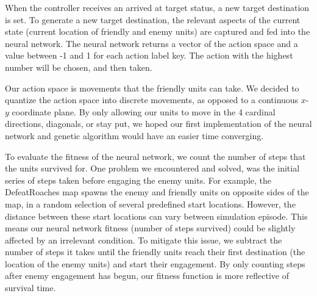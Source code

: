\documentclass{article}
\begin{document}

When the controller receives an arrived at target status, a new
target destination is set.  To generate a new target destination, the relevant
aspects of the current state (current location of friendly and enemy units) are
captured and fed into the neural network.  The neural network returns a
vector of the action space and a value between -1 and 1 for each
action label key. The action with the highest number will be chosen, and then
taken.

Our action space is movements that the friendly units can take. We decided to
quantize the action space into discrete movements, as opposed to a continuous
$x$-$y$ coordinate plane. By only allowing our units to move in the 4 cardinal
directions, diagonals, or stay put, we hoped our first implementation of the
neural network and genetic algorithm would have an easier time converging. 

To evaluate the fitness of the neural network, we count the number of steps that
the units survived for.  One problem we encountered and solved, was the initial
series of steps taken before engaging the enemy units. For example, the
DefeatRoaches map spawns the enemy and friendly units on opposite sides of the
map, in a random selection of several predefined start locations.  However, the
distance between these start locations can vary between simulation episode.
This means our neural network fitness (number of steps survived) could be
slightly affected by an irrelevant condition.  To mitigate this issue, we
subtract the number of steps it takes until the friendly units reach their first
destination (the location of the enemy units) and start their engagement. By
only counting steps after enemy engagement has begun, our fitness function is
more reflective of survival time.
\end{document}
